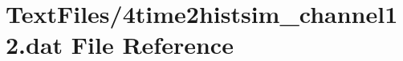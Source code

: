 \hypertarget{4time2histsim__channel12_8dat}{}\section{Text\+Files/4time2histsim\+\_\+channel12.dat File Reference}
\label{4time2histsim__channel12_8dat}

